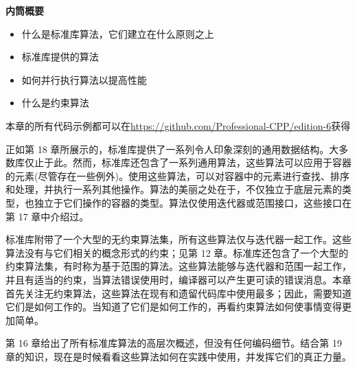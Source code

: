 \noindent
\textbf{内筒概要}

\begin{itemize}
\item
什么是标准库算法，它们建立在什么原则之上

\item
标准库提供的算法

\item
如何并行执行算法以提高性能

\item
什么是约束算法
\end{itemize}

本章的所有代码示例都可以在\url{https://github.com/Professional-CPP/edition-6}获得

正如第 18 章所展示的，标准库提供了一系列令人印象深刻的通用数据结构。大多数库仅止于此。然而，标准库还包含了一系列通用算法，这些算法可以应用于容器的元素(尽管存在一些例外)。使用这些算法，可以对容器中的元素进行查找、排序和处理，并执行一系列其他操作。算法的美丽之处在于，不仅独立于底层元素的类型，也独立于它们操作的容器的类型。算法仅使用迭代器或范围接口，这些接口在第 17 章中介绍过。

标准库附带了一个大型的无约束算法集，所有这些算法仅与迭代器一起工作。这些算法没有与它们相关的概念形式的约束；见第 12 章。标准库还包含了一个大型的约束算法集，有时称为基于范围的算法。这些算法能够与迭代器和范围一起工作，并且有适当的约束，当算法错误使用时，编译器可以产生更可读的错误消息。本章首先关注无约束算法，这些算法在现有和遗留代码库中使用最多；因此，需要知道它们是如何工作的。当知道了它们是如何工作的，再看约束算法如何使事情变得更加简单。

第 16 章给出了所有标准库算法的高层次概述，但没有任何编码细节。结合第 19 章的知识，现在是时候看看这些算法如何在实践中使用，并发挥它们的真正力量。
